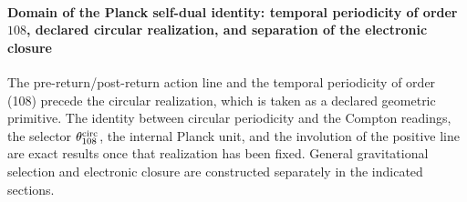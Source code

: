 \paragraph{Domain of the Planck self-dual identity: temporal periodicity of order \(108\), declared circular realization, and separation of the electronic closure}
The pre-return/post-return action line and the temporal periodicity of
order (108) precede the circular realization, which is taken as a declared
geometric primitive. The identity between circular
periodicity and the Compton readings, the
selector \(\theta_{108}^{\rm circ}\), the internal Planck unit, and the
involution of the positive line are exact results once that
realization has been fixed. General gravitational selection and electronic
closure are constructed separately in the indicated sections.
